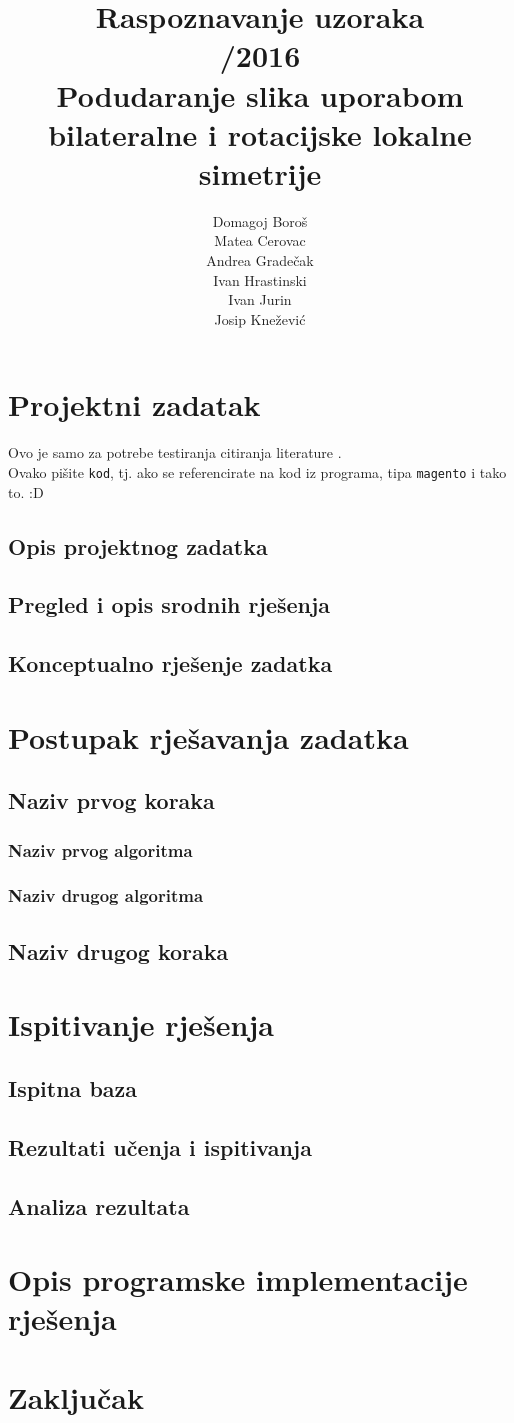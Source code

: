 \documentclass[oneside]{scrbook}
\author{Domagoj Boroš \quad \\ Matea Cerovac \quad \\ Andrea Gradečak \quad \\ Ivan Hrastinski \\ \quad Ivan Jurin \quad  \\ Josip Knežević}
\title{%
  Raspoznavanje uzoraka \\ \bigskip
  2015/2016 \\ \bigskip
  \large \fontsize{18}{18}\selectfont Podudaranje slika uporabom  \\
    bilateralne i rotacijske lokalne simetrije}
\newcommand{\code}[1]{\texttt{#1}}
\begin{document}
\maketitle
\tableofcontents

\chapter{Projektni zadatak}
Ovo je samo za potrebe testiranja citiranja literature \cite{downes2002shortams}. \\ Ovako pišite \code{kod}, tj. ako se referencirate na kod iz programa, tipa \code{magento} i tako to. :D
\section{Opis projektnog zadatka}
\section{Pregled i opis srodnih rješenja}
\section{Konceptualno rješenje zadatka}

\chapter{Postupak rješavanja zadatka}
\section{Naziv prvog koraka}
\subsection{Naziv prvog algoritma}
\subsection{Naziv drugog algoritma}
\section{Naziv drugog koraka}

\chapter{Ispitivanje rješenja}
\section{Ispitna baza}
\section{Rezultati učenja i ispitivanja}
\section{Analiza rezultata}

\chapter{Opis programske implementacije rješenja}

\chapter{Zaključak}


\end{document}
